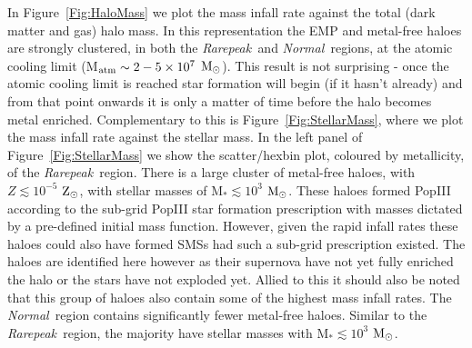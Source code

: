 \documentclass[graphics, twocolumn, usenatbib]{mn2e}
\newcommand{\msolarc} {$\rm{M_{\odot}}$}
\newcommand{\zsolarc} {$\rm{Z_{\odot}}$}
\newcommand{\rarepeak} {\textit{Rarepeak~}}
\newcommand{\normal} {\textit{Normal~}}
\begin{document}
In Figure~\ref{Fig:HaloMass} we plot the mass infall rate against the total (dark matter
and gas) halo mass. In this representation the EMP and metal-free haloes are strongly clustered, in both
the \rarepeak and \normal regions, at the atomic cooling limit (M$_{\rm atm} \sim 2 - 5 \times 10^7$
\msolarc). This result is not surprising - once the atomic cooling limit is reached star formation
will begin (if it hasn't already) and from that point onwards it is only a matter of time before
the halo becomes metal enriched. Complementary to this is Figure~\ref{Fig:StellarMass}, 
where we plot the mass infall rate against the stellar mass. In the left panel of Figure~\ref{Fig:StellarMass} we show the scatter/hexbin plot, coloured by metallicity, of the
\rarepeak region. There is a large cluster of metal-free haloes, with $Z \lesssim 10^{-5}$ \zsolarc,
with stellar masses of M$_{*} \lesssim 10^3$ \msolarc. These haloes formed PopIII
according to the sub-grid PopIII star formation prescription with masses dictated 
by a pre-defined initial mass function. However, given the rapid infall rates these 
haloes could also have formed SMSs had such a sub-grid prescription existed. The
haloes are identified here however as their supernova have not yet fully enriched the 
halo or the stars have not exploded yet. Allied to this 
it should also be noted that this group of haloes also contain some of the highest mass infall
rates. The \normal region contains significantly fewer metal-free haloes.
Similar to the \rarepeak region, the majority have stellar masses
with M$_{*} \lesssim 10^3$ \msolarc.  
\end{document}
